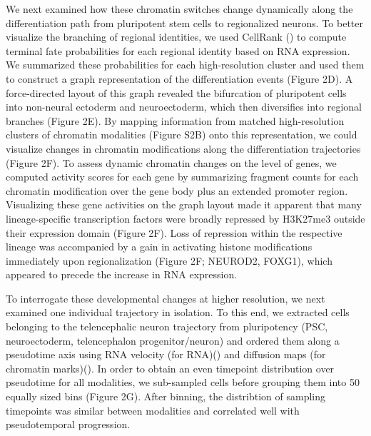 We next examined how these chromatin switches change dynamically along the differentiation path from pluripotent stem cells to regionalized neurons. To better visualize the branching of regional identities, we used CellRank (\cite{lange_cellrank_2022}) to compute terminal fate probabilities for each regional identity based on RNA expression. We summarized these probabilities for each high-resolution cluster and used them to construct a graph representation of the differentiation events (Figure 2D). A force-directed layout of this graph revealed the bifurcation of pluripotent cells into non-neural ectoderm and neuroectoderm, which then diversifies into regional branches (Figure 2E). By mapping information from matched high-resolution clusters of chromatin modalities (Figure S2B) onto this representation, we could visualize changes in chromatin modifications along the differentiation trajectories (Figure 2F). To assess dynamic chromatin changes on the level of genes, we computed activity scores for each gene by summarizing fragment counts for each chromatin modification over the gene body plus an extended promoter region. Visualizing these gene activities on the graph layout made it apparent that many lineage-specific transcription factors were broadly repressed by H3K27me3 outside their expression domain (Figure 2F). 
Loss of repression within the respective lineage was accompanied by a gain in activating histone modifications immediately upon regionalization (Figure 2F; NEUROD2, FOXG1), which appeared to precede the increase in RNA expression.

To interrogate these developmental changes at higher resolution, we next examined one individual trajectory in isolation. To this end, we extracted cells belonging to the telencephalic neuron trajectory from pluripotency (PSC, neuroectoderm, telencephalon progenitor/neuron) and ordered them along a pseudotime axis using RNA velocity (for RNA)(\cite{bergen_generalizing_2020}) and diffusion maps (for chromatin marks)(\cite{haghverdi_diffusion_2016}). In order to obtain an even timepoint distribution over pseudotime for all modalities, we sub-sampled cells before grouping them into 50 equally sized bins (Figure 2G). After binning, the distribtion of sampling timepoints was similar between modalities and correlated well with pseudotemporal progression. 

